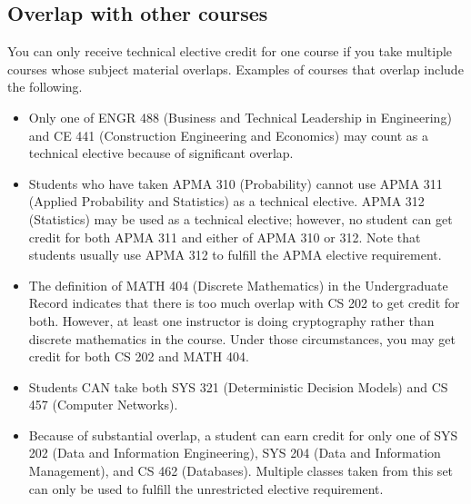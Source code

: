 \documentclass[12pt,twoside]{article}
\begin{document}

\subsection{Overlap with other courses}

You can only receive technical elective credit for one course if you
take multiple courses whose subject material overlaps.  Examples of
courses that overlap include the following.

\begin{itemize}

\item Only one of ENGR 488 (Business and Technical Leadership in
  Engineering) %
  and CE 441 (Construction Engineering and Economics) may count as a
  technical elective because of significant overlap.

\item Students who have taken APMA 310 (Probability) cannot use APMA
  311 (Applied Probability and Statistics) as a technical
  elective. APMA 312 (Statistics) may be used as a technical elective;
  however, no student can get credit for both APMA 311 and either of
  APMA 310 or 312.  Note that students usually use APMA 312 to fulfill
  the APMA elective requirement.

\item The definition of MATH 404 (Discrete Mathematics) in the
  Undergraduate Record indicates that there is too much overlap with
  CS 202 to get credit for both. However, at least one instructor is
  doing cryptography rather than discrete mathematics in the
  course. Under those circumstances, you may get credit for both CS
  202 and MATH 404.

\item Students CAN take both SYS 321 (Deterministic Decision Models)
  and CS 457 (Computer Networks).

\item Because of substantial overlap, a student can earn credit for
  only one of SYS 202 (Data and Information Engineering), SYS 204
  (Data and Information Management), and CS 462 (Databases).  Multiple
  classes taken from this set can only be used to fulfill the
  unrestricted elective requirement.

\end{itemize}
\end{document}
